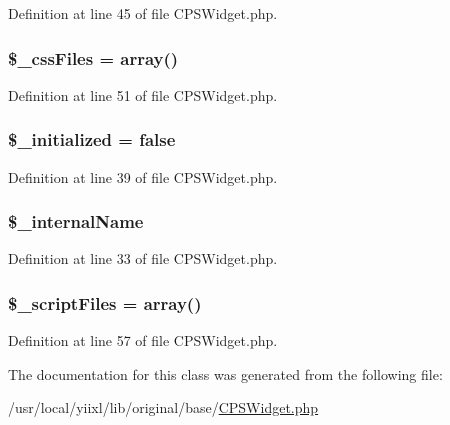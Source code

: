 Definition at line 45 of file CPSWidget.php.

\hypertarget{classCPSWidget_a7e9c2d60491b593a399659483d86f330}{
\subsubsection[{\$\_\-cssFiles}]{\setlength{\rightskip}{0pt plus 5cm}\$\_\-cssFiles = {\bf array}()}}
\label{classCPSWidget_a7e9c2d60491b593a399659483d86f330}


Definition at line 51 of file CPSWidget.php.

\hypertarget{classCPSWidget_ab6be874da7762016d79471c575d32395}{
\subsubsection[{\$\_\-initialized}]{\setlength{\rightskip}{0pt plus 5cm}\$\_\-initialized = false}}
\label{classCPSWidget_ab6be874da7762016d79471c575d32395}


Definition at line 39 of file CPSWidget.php.

\hypertarget{classCPSWidget_a0a975e9ff0c33b78b80a00bf6f3429c3}{
\subsubsection[{\$\_\-internalName}]{\setlength{\rightskip}{0pt plus 5cm}\$\_\-internalName}}
\label{classCPSWidget_a0a975e9ff0c33b78b80a00bf6f3429c3}


Definition at line 33 of file CPSWidget.php.

\hypertarget{classCPSWidget_a3cbcf4738832eece2bdc4bee0a905d27}{
\subsubsection[{\$\_\-scriptFiles}]{\setlength{\rightskip}{0pt plus 5cm}\$\_\-scriptFiles = {\bf array}()}}
\label{classCPSWidget_a3cbcf4738832eece2bdc4bee0a905d27}


Definition at line 57 of file CPSWidget.php.



The documentation for this class was generated from the following file:\begin{DoxyCompactItemize}
\item 
/usr/local/yiixl/lib/original/base/\hyperlink{CPSWidget_8php}{CPSWidget.php}\end{DoxyCompactItemize}
